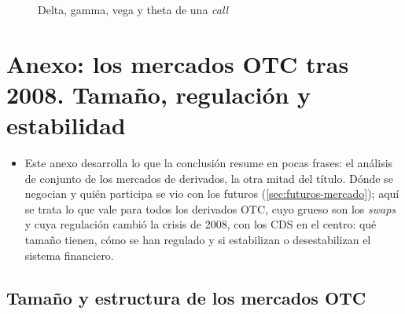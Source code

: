 \documentclass[11pt]{article}
\begin{document}
\begin{figure}[H]
\centering
\caption{Delta, gamma, vega y theta de una \emph{call}}\label{fig:griegas}
\end{figure}

\section{Anexo: los mercados OTC tras 2008.\cortetitulo{} Tamaño, regulación y estabilidad}\label{anexo:otc}\label{sec:mercados-derivados}

\begin{itemize}
\item Este anexo desarrolla lo que la conclusión resume en pocas frases: el análisis de conjunto de los mercados de derivados, la otra mitad del título. Dónde se negocian y quién participa se vio con los futuros (\ref{sec:futuros-mercado}); aquí se trata lo que vale para todos los derivados OTC, cuyo grueso son los \emph{swaps} y cuya regulación cambió la crisis de 2008, con los CDS en el centro: qué tamaño tienen, cómo se han regulado y si estabilizan o desestabilizan el sistema financiero.
\end{itemize}

\subsection{Tamaño y estructura de los mercados OTC}\label{sec:mercados-tamano}
\end{document}
